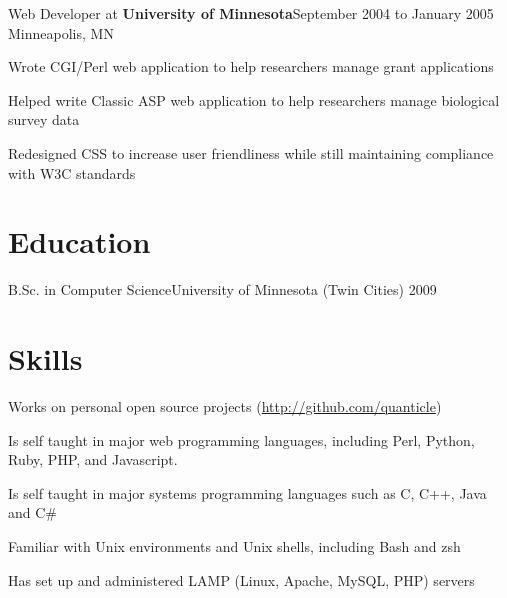 \documentclass[letterpaper]{article}
\newenvironment{resume-list}
{\begin{itemize}
 \setlength{\itemsep}{0pt}
 \setlength{\parskip}{0pt}}
{\end{itemize}}
\begin{document}
\noindent Web Developer at {\bfseries University of Minnesota}\dotfill September 2004 to January 2005\\
Minneapolis, MN
\begin{resume-list}
\item Wrote CGI/Perl web application to help researchers manage grant applications
\item Helped write Classic ASP web application to help researchers manage biological survey data
\item Redesigned CSS to increase user friendliness while still maintaining compliance with W3C standards
\end{resume-list}
\section*{Education}
\noindent B.Sc. in Computer Science\dotfill University of Minnesota (Twin Cities) 2009\\
\section*{Skills}
\begin{resume-list}
\item Works on personal open source projects (\url{http://github.com/quanticle})
\item Is self taught in major web programming languages, including Perl, Python, Ruby, PHP, and Javascript.
\item Is self taught in major systems programming languages such as C, C++, Java and C\#
\item Familiar with Unix environments and Unix shells, including Bash and zsh
\item Has set up and administered LAMP (Linux, Apache, MySQL, PHP) servers
\end{resume-list}
\end{document}
